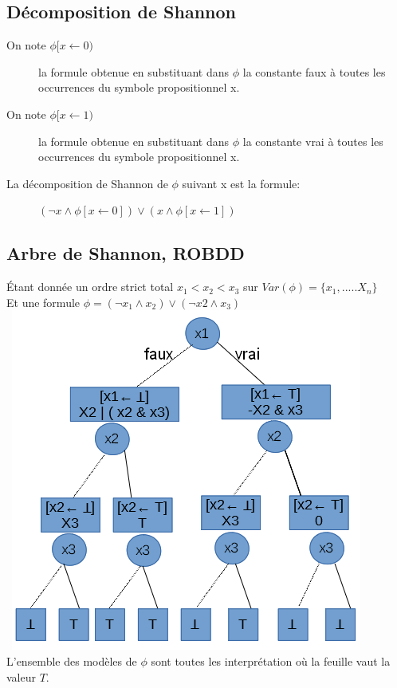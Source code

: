 \subsection{Décomposition de Shannon}
\begin{description}
\item[On note $\phi [x \leftarrow 0 ) $ ] la formule obtenue en substituant dans $\phi$ la constante faux à toutes les occurrences du symbole propositionnel x.
\item[On note $\phi [x \leftarrow 1 ) $ ] la formule obtenue en substituant dans $\phi$ la constante vrai à toutes les occurrences du symbole propositionnel x.
\end{description}

La décomposition de Shannon de $\phi$ suivant x est la formule:
\begin{description}
\item[] $(\neg x \wedge \phi [x \leftarrow 0]) \vee (x \wedge \phi [x \leftarrow 1])$
\end{description}

\pagebreak
\subsection{Arbre de Shannon, ROBDD}
Étant donnée un ordre strict total $x_1 < x_2 < x_3$ sur $Var(\phi ) = \{x_1, ..... X_n\}$\\
Et une formule $\phi = (\neg x_1 \wedge x_2) \vee ( \neg x2 \wedge x_3)$\\\
\includegraphics[scale=0.4]{img/of-arbre-shannon_1.png} \\
L'ensemble des modèles de $\phi$ sont toutes les interprétation où la feuille vaut la valeur $T$.

